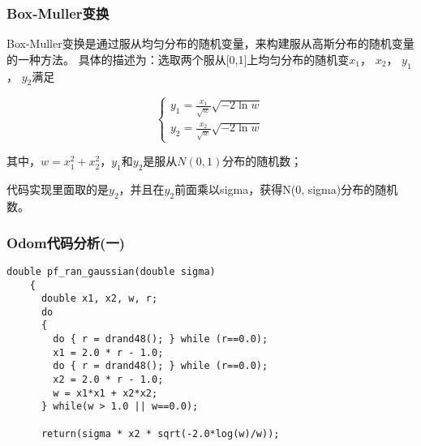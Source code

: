 \begin{frame}
  \frametitle{Box-Muller变换}

  Box-Muller变换是通过服从均匀分布的随机变量，来构建服从高斯分布的随机变量的一种方法。
  具体的描述为：选取两个服从[0,1]上均匀分布的随机变$x_1$， $x_2$， $y_1$， $y_2$满足


  \begin{equation}
    \begin{cases}
      y_1 = \frac{x_1}{\sqrt{w}} \sqrt{-2 \ln{w}} \\
      y_2 = \frac{x_2}{\sqrt{w}} \sqrt{-2 \ln{w}}
    \end{cases}
  \end{equation}

  其中，$w = x_1^2 + x_2^2$，$y_1$和$y_2$是服从$N(0,1)$分布的随机数；

  代码实现里面取的是$y_2$，并且在$y_2$前面乘以sigma，获得N(0, sigma)分布的随机数。

\end{frame}

\begin{frame}[fragile]
  \frametitle{Odom代码分析(一)}
  \begin{lstlisting}[frame=shadowbox]  
    double pf_ran_gaussian(double sigma)
    {
      double x1, x2, w, r;
      do
      {
        do { r = drand48(); } while (r==0.0);
        x1 = 2.0 * r - 1.0;
        do { r = drand48(); } while (r==0.0);
        x2 = 2.0 * r - 1.0;
        w = x1*x1 + x2*x2;
      } while(w > 1.0 || w==0.0);

      return(sigma * x2 * sqrt(-2.0*log(w)/w));

  \end{lstlisting}
\end{frame}


